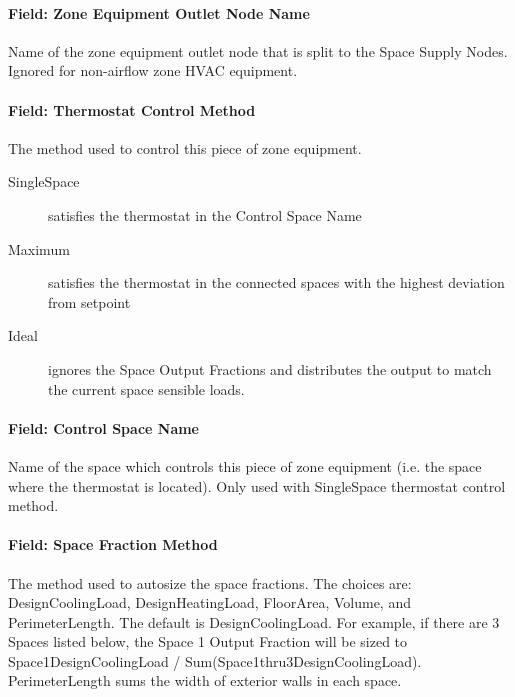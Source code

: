 \paragraph{Field: Zone Equipment Outlet Node Name}\label{field-seqsplitter-zone-equipment-outlet-node-name}

Name of the zone equipment outlet node that is split to the Space Supply Nodes. Ignored for non-airflow zone HVAC equipment.

\paragraph{Field: Thermostat Control Method}\label{field-seqsplitter-thermostat-control-method}

The method used to control this piece of zone equipment.

\begin{description}
       \item[SingleSpace] satisfies the thermostat in the Control Space Name
       \item[Maximum] satisfies the thermostat in the connected spaces with the highest deviation from setpoint
       \item[Ideal] ignores the Space Output Fractions and distributes the output to match the current space sensible loads.
\end{description}

\paragraph{Field: Control Space Name}\label{field-seqsplitter-control-space-name}

Name of the space which controls this piece of zone equipment (i.e. the space where the thermostat is located). Only used with SingleSpace thermostat control method.

\paragraph{Field: Space Fraction Method}\label{field-seqsplitter-space-sizing-basis}

The method used to autosize the space fractions. The choices are: DesignCoolingLoad, DesignHeatingLoad, FloorArea, Volume, and PerimeterLength. The default is DesignCoolingLoad.
For example, if there are 3 Spaces listed below, the Space 1 Output Fraction will be sized to Space1DesignCoolingLoad / Sum(Space1thru3DesignCoolingLoad). PerimeterLength sums the width of exterior walls in each space.

